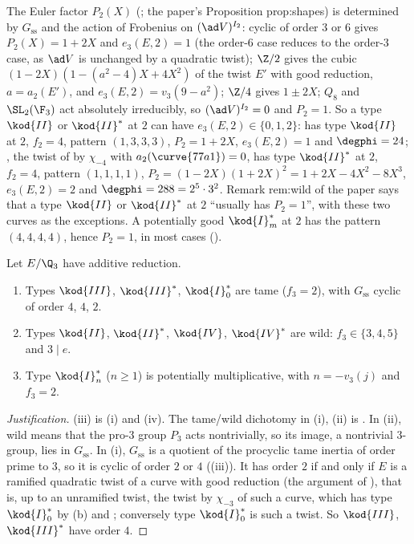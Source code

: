 \begin{paperlink}
The Euler factor $P_2(X)$ (; the paper's Proposition prop:shapes) is determined by $G_{\mathrm{ss}}$ and the action of
Frobenius on $(\ad V)^{I_2}$: cyclic of order $3$ or $6$ gives $P_2(X)=1+2X$ and $e_3(E,2)=1$ (the order-$6$ case reduces to the order-$3$
case, as $\ad V$ is unchanged by a quadratic twist); $\Z/2$ gives the cubic $(1-2X)(1-(a^2-4)X+4X^2)$ of the twist $E'$ with good reduction,
$a=a_2(E')$, and $e_3(E,2)=v_3(9-a^2)$; $\Z/4$ gives $1\pm2X$; $Q_8$ and $\SL_2(\F_3)$ act absolutely irreducibly, so $(\ad V)^{I_2}=0$ and
$P_2=1$. So a type $\kod{II}$ or $\kod{II}^*$ at $2$ can have $e_3(E,2)\in\{0,1,2\}$:  has type $\kod{II}$ at $2$, $f_2=4$, pattern
$(1,3,3,3)$, $P_2=1+2X$, $e_3(E,2)=1$ and $\degphi=24$; , the twist of  by $\chi_{-4}$ with $a_2(\curve{77a1})=0$, has
type $\kod{II}^*$ at $2$, $f_2=4$, pattern $(1,1,1,1)$, $P_2=(1-2X)(1+2X)^2=1+2X-4X^2-8X^3$, $e_3(E,2)=2$ and $\degphi=288=2^5\cdot3^2$. Remark
rem:wild of the paper says that a type $\kod{II}$ or $\kod{II}^*$ at $2$ ``usually has $P_2=1$'', with these two curves as the exceptions. A potentially good $\kod{I}_m^*$ at $2$ has the pattern $(4,4,4,4)$, hence $P_2=1$, in most cases
().
\end{paperlink}

\begin{remark}\label{rem:reduction:wild-at-3}
Let $E/\Q_3$ have additive reduction.
\begin{enumerate}[label=(\roman*)]
\item Types $\kod{III}$, $\kod{III}^*$, $\kod{I}_0^*$ are tame ($f_3=2$), with $G_{\mathrm{ss}}$ cyclic of order $4$, $4$, $2$.
\item Types $\kod{II}$, $\kod{II}^*$, $\kod{IV}$, $\kod{IV}^*$ are wild: $f_3\in\{3,4,5\}$ and $3\mid e$.
\item Type $\kod{I}_n^*$ ($n\ge1$) is potentially multiplicative, with $n=-v_3(j)$ and $f_3=2$.
\end{enumerate}
\end{remark}

\begin{proof}[Justification]
(iii) is (i) and (iv). The tame/wild dichotomy in (i), (ii) is
. In (ii), wild means that the pro-$3$ group $P_3$ acts nontrivially, so its image, a nontrivial
$3$-group, lies in $G_{\mathrm{ss}}$. In (i), $G_{\mathrm{ss}}$ is a quotient of the procyclic tame inertia of order prime to $3$, so it is
cyclic of order $2$ or $4$ ((iii)). It has order $2$ if and only if $E$ is a ramified quadratic twist of a
curve with good reduction (the argument of ), that is, up to an unramified twist, the twist by $\chi_{-3}$
of such a curve, which has type $\kod{I}_0^*$ by (b) and ;
conversely type $\kod{I}_0^*$ is such a twist. So $\kod{III}$, $\kod{III}^*$ have order $4$.
\end{proof}

